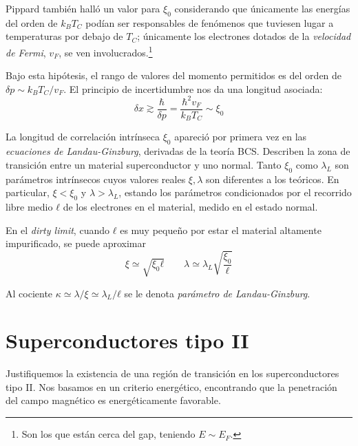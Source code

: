 \documentclass{tufte-book}
\newcommand{\sub}[1]{_{{\scriptscriptstyle\mathit{#1}}}}
\newcommand{\kb}{k\sub{B}}
\begin{document}
Pippard también halló un valor para $ξ_0$ considerando que únicamente
las energías del orden de $\kb T\sub{C}$ podían ser responsables
de fenómenos que tuviesen lugar a temperaturas por debajo de
$T\sub{C}$; únicamente los electrones dotados de la \emph{velocidad de
Fermi}, $v\sub{F}$, se ven involucrados.\footnote{Son los que están
cerca del gap, teniendo $E∼E\sub{F}$.}

Bajo esta hipótesis, el rango de valores del momento permitidos es del
orden de $δp∼\kb T\sub{C}/v\sub{F}$. El principio de incertidumbre
nos da una longitud asociada:
\begin{equation}
  δx ≳ \frac{ℏ}{δp} = \frac{ℏ^2v\sub{F}}{\kb T\sub{C}} ∼ ξ_0
\end{equation}

La longitud de correlación intrínseca $ξ_0$ apareció por primera vez
en las \emph{ecuaciones de Landau-Ginzburg}, derivadas de la teoría
BCS. Describen la zona de transición entre un material superconductor
y uno normal. Tanto $ξ_0$ como $λ\sub{L}$ son parámetros intrínsecos
cuyos valores reales $ξ, λ$ son diferentes a los teóricos. En
particular, $ξ<ξ_0$ y $λ > λ\sub{L}$, estando los parámetros
condicionados por el recorrido libre medio $ℓ$ de los electrones en el
material, medido en el estado normal.

En el \emph{dirty limit}, cuando $ℓ$ es muy pequeño por estar el
material altamente impurificado, se puede aproximar
\begin{equation}
  ξ ≃ \sqrt{ξ_0ℓ} \qquad λ ≃ λ\sub{L} \sqrt{\frac{ξ_0}{ℓ}}
\end{equation}

Al cociente $κ≃λ/ξ≃λ\sub{L}/ℓ$ se le denota \emph{parámetro de Landau-Ginzburg}.


\section{Superconductores tipo II}

Justifiquemos la existencia de una región de transición en los
superconductores tipo II. Nos basamos en un criterio energético,
encontrando que la penetración del campo magnético es energéticamente
favorable.
\end{document}

